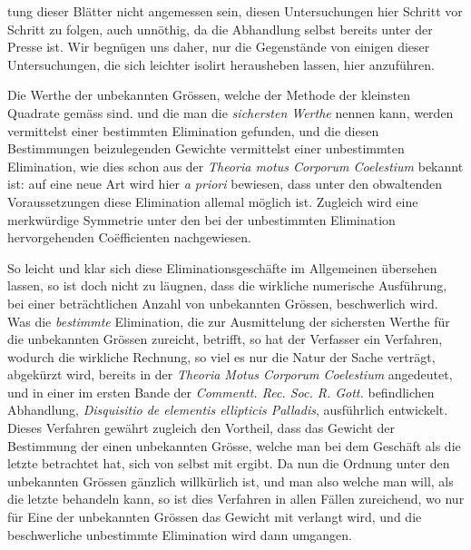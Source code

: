 %
tung dieser Blätter nicht angemessen sein, diesen Untersuchungen hier Schritt vor Schritt zu folgen, auch unnöthig, da die Abhandlung selbst bereits unter der Presse ist. Wir begnügen uns daher, nur die Gegenstände von einigen dieser Untersuchungen, die sich leichter isolirt herausheben lassen, hier anzuführen.

Die Werthe der unbekannten Grössen, welche der Methode der kleinsten Quadrate gemäss sind. und die man die \textit{sichersten Werthe} nennen kann, werden vermittelst einer bestimmten Elimination gefunden, und die diesen Bestimmungen beizulegenden Gewichte vermittelst einer unbestimmten Elimination, wie dies schon aus der \textit{Theoria motus Corporum Coelestium} bekannt ist: auf eine neue Art wird hier \textit{a priori} bewiesen, dass unter den obwaltenden Voraussetzungen diese Elimination allemal möglich ist. Zugleich wird eine merkwürdige Symmetrie unter den bei der unbestimmten Elimination hervorgehenden Coëfficienten nachgewiesen.

So leicht und klar sich diese Eliminationsgeschäfte im Allgemeinen übersehen lassen, so ist doch nicht zu läugnen, dass die wirkliche numerische Ausführung, bei einer beträchtlichen Anzahl von unbekannten Grössen, beschwerlich wird. Was die \textit{bestimmte} Elimination, die zur Ausmittelung der sichersten Werthe für die unbekannten Grössen zureicht, betrifft, so hat der Verfasser ein Verfahren, wodurch die wirkliche Rechnung, so viel es nur die Natur der Sache verträgt, abgekürzt wird, bereits in der \textit{Theoria Motus Corporum Coelestium} angedeutet, und in einer im ersten Bande der \textit{Commentt. Rec. Soc. R. Gott.} befindlichen Abhandlung, \textit{Disquisitio de elementis ellipticis Palladis}, ausführlich entwickelt. Dieses Verfahren gewährt zugleich den Vortheil, dass das Gewicht der Bestimmung der einen unbekannten Grösse, welche man bei dem Geschäft als die letzte betrachtet hat, sich von selbst mit ergibt. Da nun die Ordnung unter den unbekannten Grössen gänzlich willkürlich ist, und man also welche man will, als die letzte behandeln kann, so ist dies Verfahren in allen Fällen zureichend, wo nur für Eine der unbekannten Grössen das Gewicht mit verlangt wird, und die beschwerliche unbestimmte Elimination wird dann umgangen.

